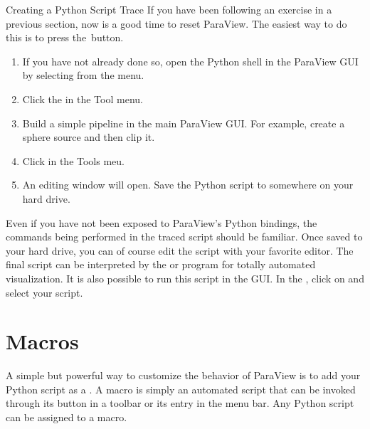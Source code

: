 \begin{exercise}{Creating a Python Script Trace}
  \label{ex:CreatingAPythonScriptTrace}%
  If you have been following an exercise in a previous section, now is a
  good time to reset ParaView.  The easiest way to do this is to press
  the~\disconnect button.

  \begin{enumerate}
  \item If you have not already done so, open the Python shell in the
    ParaView GUI by selecting  \ra {} from the
    menu.
  \item Click the  in the Tool menu.
  \item Build a simple pipeline in the main
    ParaView GUI.  For example, create a sphere source and then clip it.
  \item Click  in the Tools meu.  
  \item An editing window will open.  Save the Python script to somewhere 
    on your hard drive.
  \end{enumerate}

  Even if you have not been exposed to ParaView's Python bindings, the
  commands being performed in the traced script should be familiar.  Once
  saved to your hard drive, you can of course edit the script with your
  favorite editor.  The final script can be interpreted by the
   or  program for totally
  automated visualization.  It is also possible to run this script in the
  GUI.  In the , click on  and 
  select your script.
\end{exercise}

\section{Macros}
\label{sec:Macros}

A simple but powerful way to customize the behavior of ParaView is to
add your Python script as a .  A macro is simply an 
automated script that can
be invoked through its button in a toolbar or its entry in the menu bar.
Any Python script can be assigned to a macro.

